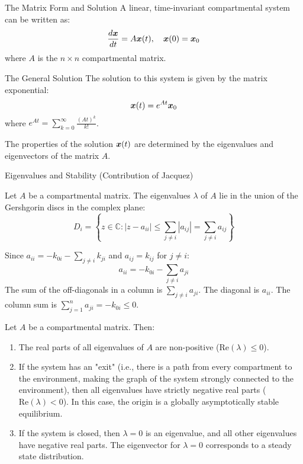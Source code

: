 \documentclass[aspectratio=169]{beamer}\usepackage[]{graphicx}\usepackage[]{xcolor}
\begin{document}
\begin{frame}{The Matrix Form and Solution}
    A linear, time-invariant compartmental system can be written as:
    $$ \frac{d\bm{x}}{dt} = A\bm{x}(t), \quad \bm{x}(0) = \bm{x}_0 $$
    where $A$ is the $n \times n$ compartmental matrix.

    \begin{block}{The General Solution}
        The solution to this system is given by the matrix exponential:
        $$ \bm{x}(t) = e^{At} \bm{x}_0 $$
        where $e^{At} = \sum_{k=0}^{\infty} \frac{(At)^k}{k!}$.
    \end{block}

    The properties of the solution $\bm{x}(t)$ are determined by the eigenvalues and eigenvectors of the matrix $A$.
\end{frame}

\begin{frame}{Eigenvalues and Stability (Contribution of Jacquez)}
    \begin{theorem}
        Let $A$ be a compartmental matrix. The eigenvalues $\lambda$ of $A$ lie in the union of the Gershgorin discs in the complex plane:
        $$ D_i = \left\{ z \in \mathbb{C} : |z - a_{ii}| \le \sum_{j \neq i} |a_{ij}| = \sum_{j \neq i} a_{ij} \right\} $$
    \end{theorem}
    Since $a_{ii} = -k_{0i} - \sum_{j \neq i} k_{ji}$ and $a_{ij} = k_{ij}$ for $j \neq i$:
    $$ a_{ii} = -k_{0i} - \sum_{j \neq i} a_{ji} $$
    The sum of the off-diagonals in a column is $\sum_{j \neq i} a_{ji}$. The diagonal is $a_{ii}$. The column sum is $\sum_{j=1}^n a_{ji} = -k_{0i} \le 0$.

    \begin{theorem}
        Let $A$ be a compartmental matrix. Then:
        \begin{enumerate}
            \item The real parts of all eigenvalues of $A$ are non-positive ($\text{Re}(\lambda) \le 0$).
            \item If the system has an "exit" (i.e., there is a path from every compartment to the environment, making the graph of the system strongly connected to the environment), then all eigenvalues have strictly negative real parts ($\text{Re}(\lambda) < 0$). In this case, the origin is a globally asymptotically stable equilibrium.
            \item If the system is closed, then $\lambda=0$ is an eigenvalue, and all other eigenvalues have negative real parts. The eigenvector for $\lambda=0$ corresponds to a steady state distribution.
        \end{enumerate}
    \end{theorem}
\end{frame}
\end{document}
